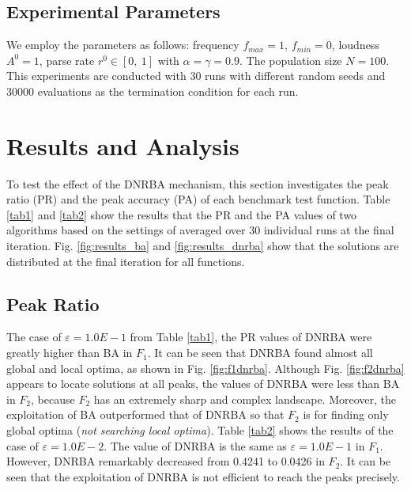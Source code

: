  \subsection{Experimental Parameters}
We employ the parameters as follows: frequency $f_{max}=1$, $f_{min}=0$, loudness ${A^0}=1$, parse rate ${r^0} \in [0, \ 1]$ with ${\alpha =\gamma = 0.9}$. The population size ${N=100}$. This experiments are conducted with 30 runs with different random seeds and 30000 evaluations as the termination condition for each run.

\section{Results and Analysis}
To test the effect of the DNRBA mechanism, this section investigates the peak ratio (PR) and the peak accuracy (PA) of each benchmark test function. Table \ref{tab1} and \ref{tab2} show the results that the PR and the PA values of two algorithms based on the settings of averaged over 30 individual runs at the final iteration. Fig. \ref{fig:results_ba} and \ref{fig:results_dnrba} show that the solutions are distributed at the final iteration for all functions.

\subsection{Peak Ratio}
The case of $\varepsilon=1.0E-1$ from Table \ref{tab1}, the PR values of DNRBA were greatly higher than BA in $F_1$. It can be seen that DNRBA found almost all global and local optima, as shown in Fig. \ref{fig:f1dnrba}. Although Fig. \ref{fig:f2dnrba} appears to locate solutions at all peaks, the values of DNRBA were less than BA in $F_2$, because $F_2$ has an extremely sharp and complex landscape. Moreover, the exploitation of BA outperformed that of DNRBA so that $F_2$ is for finding only global optima (\textit{not searching local optima}). Table \ref{tab2} shows the results of the case of $\varepsilon=1.0E-2$. The value of DNRBA is the same as $\varepsilon=1.0E-1$ in $F_1$. However, DNRBA remarkably decreased from 0.4241 to 0.0426 in $F_2$. It can be seen that the exploitation of DNRBA is not efficient to reach the peaks precisely.  

